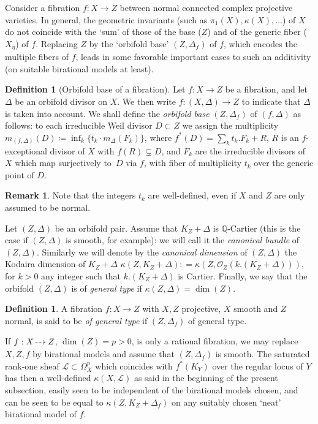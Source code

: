 \documentclass[JEP,XML,SOM,Unicode, NoEqCountersInSection,NoFloatCountersInSection,published]{cedram}
\let\mathcal\mathscr
\newcommand{\dradpl}{{\hspace*{-2.5mm}\begin{tikzcd}[ampersand replacement=\&,column sep = scriptsize]\mbox{}\ar[r,dashed]\&\mbox{}\end{tikzcd}\hspace*{-2.5mm}}}
\newcommand{\dratst}{{\hspace*{-2.5mm}\begin{tikzcd}[ampersand replacement=\&,column sep = small]\mbox{}\ar[r,dashed]\&\mbox{}\end{tikzcd}\hspace*{-2mm}}}
\let\drascst\dratst
\newcommand{\dra}{\mathchoice{\dradpl}{\dratst}{\drascst}{\drascst}}
\let\dasharrow\dra
\theoremstyle{theorem}
\theoremstyle{definition}
\newtheorem{definition}[proposition]{Definition}
\newtheorem{remark}[proposition]{Remark}
\def\bQ{{\mathbb Q}}
\newcommand{\calL}{{\mathcal L}}
\newcommand{\calO}{{\mathcal O}}
\newcommand{\bydef}{\coloneqq}
\begin{document}
Consider a fibration \(f\colon X\to Z\) between normal connected complex projective varieties. In general, the geometric invariants (such as \(\pi_1(X), \kappa(X),\dots\)) of \(X\) do not coincide with the `sum' of those of the base (\(Z\)) and of the generic fiber (\(X_\eta\)) of \(f\).
Replacing \(Z\) by the `orbifold base' \((Z,\Delta_f)\) of \(f\), which encodes the multiple fibers of \(f\), leads in some favorable important cases to such an additivity (on suitable birational models at least).

\begin{definition}[Orbifold base of a fibration]
\label{dob}
Let $f:X \to Z$ be a fibration, and let $\Delta$ be an orbifold divisor on \(X\). We then write \(f\colon (X,\Delta)\to Z\) to indicate that $\Delta$ is taken into account.
We shall define the \emph{orbifold base} \((Z,\Delta_{f})\) of \((f,\Delta)\) as follows: to each irreducible Weil divisor \(D\subset Z\) we assign the multiplicity \(m_{(f,\Delta)}(D)\bydef\inf_k\{t_k\cdot m_\Delta(F_k)\}\), where \(f^*(D)=\sum_k t_k.F_k+R\), \(R\) is an \(f\)-exceptional divisor of \(X\) with \(f(R)\subsetneq D\), and \(F_k\) are the irreducible divisors of \(X\) which map surjectively to~\(D\) via $f$, with fiber of multiplicity $t_k$ over the generic point of $D$.
\end{definition}
\begin{remark}
Note that the integers \(t_k\) are well-defined, even if \(X\) and \(Z\) are only assumed to be normal.
\end{remark}

Let \((Z,\Delta)\) be an orbifold pair. Assume that \(K_Z+\Delta\) is \(\bQ\)-Cartier (this is the case if \((Z,\Delta)\) is smooth, for example): we will call it the \emph{canonical bundle} of \((Z,\Delta)\). Similarly we will denote by the {\it canonical dimension} of $(Z,\Delta)$ the Kodaira dimension of $K_Z + \Delta$ \ie $\kappa(Z,K_Z+
\Delta): = \kappa(Z,\calO_Z(k.(K_Z+\Delta)))$, for $k>0$ any integer such that $k.(K_Z+\Delta)$ is Cartier. Finally, we say that the orbifold \((Z,\Delta)\) is of {\it general type} if \(\kappa(Z,\Delta)=\dim(Z)\).

\begin{definition}
A fibration \(f\colon X\to Z\) with $X,Z$ projective, $X$ smooth and $Z$ normal, is said to be \emph{of general type} if \((Z,\Delta_{f})\) of general type.
\end{definition}

If $f:X\dasharrow Z$, $\dim(Z)=p>0$, is only a rational fibration, we may replace $X,Z,f$ by birational models and assume that $(Z,\Delta_f)$ is smooth.
The saturated rank-one sheaf $\calL\subset \Omega^p_X$ which coincides with $f^*(K_Y)$ over the regular locus of $Y$ has then a well-defined $\kappa(X,\calL)$ as said in the beginning of the present subsection, easily seen to be independent of the birational models chosen, and can be seen to be equal to $\kappa(Z,K_Z+\Delta_f)$ on any suitably chosen `neat' birational model of $f$.
\end{document}
